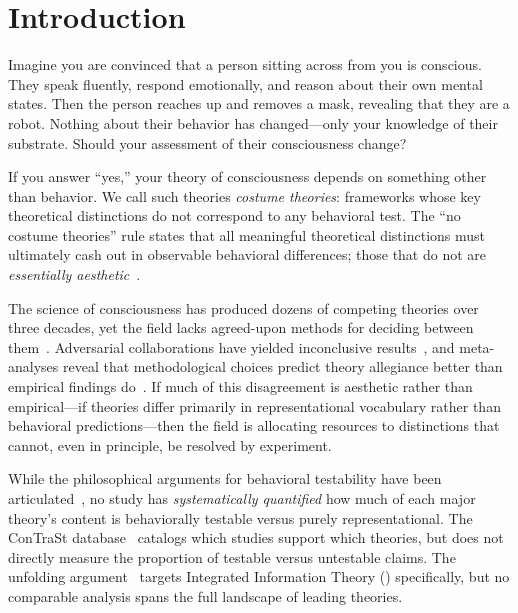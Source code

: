 \section{Introduction}
\label{sec:intro}

Imagine you are convinced that a person sitting across from you is conscious.
They speak fluently, respond emotionally, and reason about their own mental states.
Then the person reaches up and removes a mask, revealing that they are a robot.
Nothing about their behavior has changed---only your knowledge of their substrate.
Should your assessment of their consciousness change?

If you answer ``yes,'' your theory of consciousness depends on something other than behavior.
We call such theories \emph{costume theories}: frameworks whose key theoretical distinctions do not correspond to any behavioral test.
The ``no costume theories'' rule states that all meaningful theoretical distinctions must ultimately cash out in observable behavioral differences; those that do not are \emph{essentially aesthetic}~\citep{dennett1988quining}.

The science of consciousness has produced dozens of competing theories over three decades, yet the field lacks agreed-upon methods for deciding between them~\citep{yaron2022contrast, kirkeby2024quantifying}.
Adversarial collaborations have yielded inconclusive results~\citep{melloni2023adversarial}, and meta-analyses reveal that methodological choices predict theory allegiance better than empirical findings do~\citep{yaron2022contrast}.
If much of this disagreement is aesthetic rather than empirical---if theories differ primarily in representational vocabulary rather than behavioral predictions---then the field is allocating resources to distinctions that cannot, even in principle, be resolved by experiment.

While the philosophical arguments for behavioral testability have been articulated~\citep{dennett1988quining, doerig2019unfolding}, no study has \emph{systematically quantified} how much of each major theory's content is behaviorally testable versus purely representational.
The ConTraSt database~\citep{yaron2022contrast} catalogs which studies support which theories, but does not directly measure the proportion of testable versus untestable claims.
The unfolding argument~\citep{doerig2019unfolding} targets Integrated Information Theory (\IIT) specifically, but no comparable analysis spans the full landscape of leading theories.

